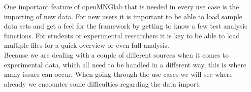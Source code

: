 One important feature of openMNGlab that is needed in every use case is the importing of new data. For new users it is important to be able to load sample data sets and get a feel for the framework by getting to know a few test analysis functions. For students or experimental researchers it is key to be able to load multiple files for a quick overview or even full analysis.\\
Because we are dealing with a couple of different sources when it comes to experimental data, which all need to be handled in a different way, this is where many issues can occur. When going through the use cases we will see where already we encounter some difficulties regarding the data import.

